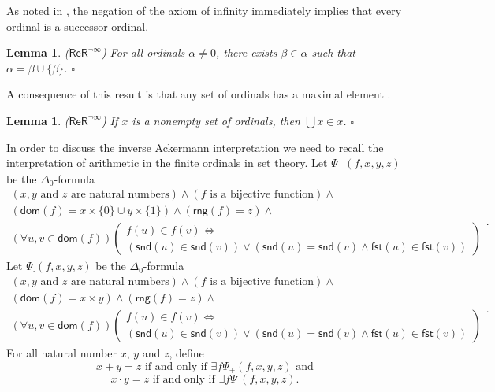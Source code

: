 \documentclass[11pt, a4paper]{article}
\newcounter{Theor1}
\newtheorem{lemma}[theorem]{Lemma}
\begin{document}
As noted in \cite[Theorem 5]{kw07}, the negation of the axiom of infinity immediately implies that every ordinal is a successor ordinal.

\begin{lemma} \label{Th:EveryOrdinalASuccessor}
($\mathsf{ReR}^{\neg \infty}$) For all ordinals $\alpha \neq 0$, there exists $\beta \in \alpha$ such that $\alpha= \beta \cup \{\beta\}$. \hfill$\square$
\end{lemma}

A consequence of this result is that any set of ordinals has a maximal element \cite[Corollary 6]{kw07}.  

\begin{lemma} \label{Th:EverySetOfOrdinalsHasMaximum}
($\mathsf{ReR}^{\neg \infty}$) If $x$ is a nonempty set of ordinals, then $\bigcup x \in x$. \hfill$\square$
\end{lemma}

In order to discuss the inverse Ackermann interpretation we need to recall the interpretation of arithmetic in the finite ordinals in set theory. Let $\Psi_+(f, x, y, z)$ be the $\Delta_0$-formula
\[
\begin{array}{c}
(x, y \textrm{ and } z \textrm{ are natural numbers}) \land (f \textrm{ is a bijective function}) \land\\ 
(\mathsf{dom}(f)= x \times \{0\} \cup y \times \{1\}) \land (\mathsf{rng}(f)=z) \land\\
(\forall u, v \in \mathsf{dom}(f))\left( \begin{array}{c}
f(u) \in f(v) \iff\\
(\mathsf{snd}(u) \in \mathsf{snd}(v)) \lor (\mathsf{snd}(u)=\mathsf{snd}(v) \land \mathsf{fst}(u) \in \mathsf{fst}(v)) 
\end{array}\right)
\end{array}.
\]
Let $\Psi_{\cdot}(f, x, y, z)$ be the $\Delta_0$-formula
\[
\begin{array}{c}
(x, y \textrm{ and } z \textrm{ are natural numbers}) \land (f \textrm{ is a bijective function}) \land\\ 
(\mathsf{dom}(f)= x \times y) \land (\mathsf{rng}(f)= z) \land\\
(\forall u, v \in \mathsf{dom}(f))\left( \begin{array}{c}
f(u) \in f(v) \iff\\
(\mathsf{snd}(u) \in \mathsf{snd}(v)) \lor (\mathsf{snd}(u)=\mathsf{snd}(v) \land \mathsf{fst}(u) \in \mathsf{fst}(v)) 
\end{array}\right)
\end{array}.
\]
For all natural number $x$, $y$ and $z$, define
\[
x+y=z \textrm{ if and only if } \exists f \Psi_+(f, x, y, z) \textrm{ and}
\]
\[
x\cdot y=z \textrm{ if and only if } \exists f \Psi_{\cdot}(f, x, y, z).
\]
\end{document}
